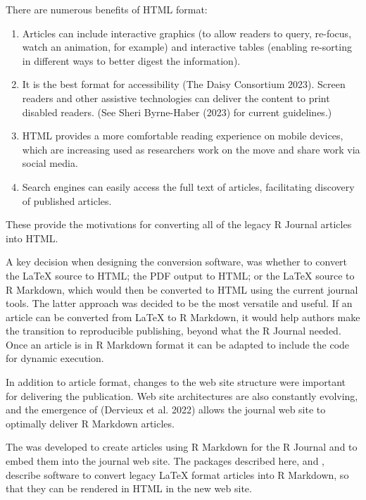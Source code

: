 There are numerous benefits of HTML format:

\begin{enumerate}
\def\labelenumi{\arabic{enumi}.}
\tightlist
\item
  Articles can include interactive graphics (to allow readers to query, re-focus, watch an animation, for example) and interactive tables (enabling re-sorting in different ways to better digest the information).
\item
  It is the best format for accessibility (The Daisy Consortium 2023). Screen readers and other assistive technologies can deliver the content to print disabled readers. (See Sheri Byrne-Haber (2023) for current guidelines.)
\item
  HTML provides a more comfortable reading experience on mobile devices, which are increasing used as researchers work on the move and share work via social media.
\item
  Search engines can easily access the full text of articles, facilitating discovery of published articles.
\end{enumerate}

These provide the motivations for converting all of the legacy R Journal articles into HTML.

A key decision when designing the conversion software, was whether to convert the LaTeX source to HTML; the PDF output to HTML; or the LaTeX source to R Markdown, which would then be converted to HTML using the current journal tools. The latter approach was decided to be the most versatile and useful. If an article can be converted from LaTeX to R Markdown, it would help authors make the transition to reproducible publishing, beyond what the R Journal needed. Once an article is in R Markdown format it can be adapted to include the code for dynamic execution.

In addition to article format, changes to the web site structure were important for delivering the publication. Web site architectures are also constantly evolving, and the emergence of  (Dervieux et al. 2022) allows the journal web site to optimally deliver R Markdown articles.

The  was developed to create articles using R Markdown for the R Journal and to embed them into the journal web site. The packages described here,  and , describe software to convert legacy LaTeX format articles into R Markdown, so that they can be rendered in HTML in the new web site.


